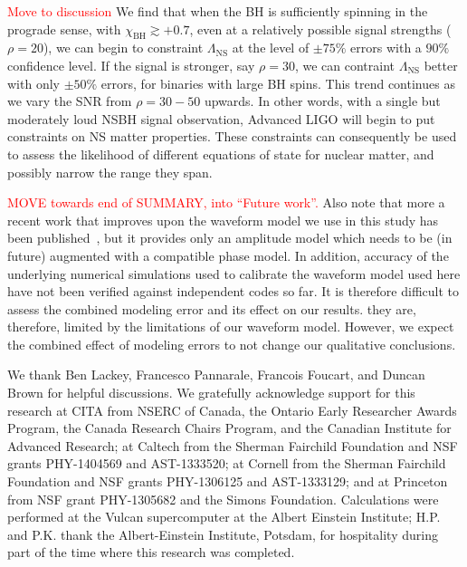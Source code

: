 \documentclass[aps,prd,amsmath,floats,floatfix, twocolumn,
superscriptaddress,nofootinbib,showpacs]{revtex4-1}
\newcommand{\red}{\textcolor{red}}
\newcommand{\prayush}{\textcolor{red!40!black}}
\newcommand{\lambdans}{\Lambda_\mathrm{NS}}
\newcommand{\chibh}{\chi_\mathrm{BH}}
\begin{document}
\red{Move to discussion}
\prayush{%
We find that when the BH is sufficiently spinning in the prograde sense,
with $\chibh\gtrsim +0.7$, even at a relatively possible signal strengths ($\rho=20$),
we can begin to constraint $\lambdans$ at the level of $\pm 75\%$ errors with a $90\%$
confidence level. If the signal is stronger, say $\rho=30$, we can contraint
$\lambdans$ better with only $\pm 50\%$ errors, for binaries with large BH spins.
This trend continues as we vary the SNR from $\rho=30-50$ upwards. In other words,
with a single but moderately loud NSBH signal observation, Advanced LIGO will begin
to put constraints on NS matter properties. These constraints can consequently
be used to assess the likelihood of different equations of state for nuclear
matter, and possibly narrow the range they span.
}


\red{
MOVE towards end of SUMMARY, into ``Future work''.
}
\prayush{
Also note
that more a recent work that improves upon the waveform model we use in this
study has been published~\cite{Pannarale:2015jka}, but it provides only an 
amplitude model which needs to be (in future) augmented with a compatible
phase model. In addition, accuracy of the underlying numerical simulations 
used to calibrate the waveform model used here have not been verified against 
independent codes so far.
It is therefore difficult to assess the combined modeling error and its effect
on our results. they are, therefore, limited by the limitations of our
waveform model. However, we expect the combined effect of modeling errors to
not change our qualitative conclusions.
}


\begin{acknowledgments}
We thank Ben Lackey, Francesco Pannarale, Francois Foucart, and Duncan Brown
    for helpful discussions. We gratefully acknowledge support
  for this research at CITA from NSERC of Canada, the Ontario Early 
  Researcher Awards Program, the Canada Research
  Chairs Program, and the Canadian Institute for Advanced Research; at
  Caltech from the Sherman Fairchild Foundation and NSF grants
  PHY-1404569 and AST-1333520; at Cornell from the
  Sherman Fairchild Foundation and NSF grants PHY-1306125 and
  AST-1333129; and at Princeton from NSF grant PHY-1305682 and the
  Simons Foundation.  Calculations were performed at the Vulcan
  supercomputer at the Albert Einstein Institute;
  H.P. and P.K. thank the Albert-Einstein Institute,
  Potsdam, for hospitality during part of the time where this research
  was completed.
\end{acknowledgments}
\end{document}
